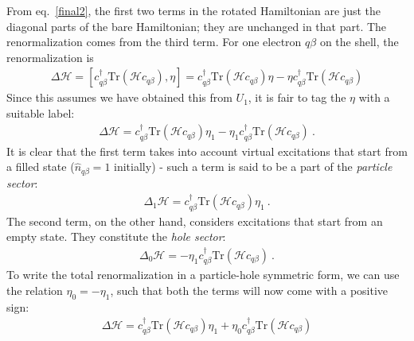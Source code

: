 From eq.~\ref{final2}, the first two terms in the rotated Hamiltonian are just the diagonal parts of the bare Hamiltonian; they are unchanged in that part. The renormalization comes from the third term. For one electron \(q\beta\) on the shell, the renormalization is
\begin{equation}\begin{aligned}
	\Delta \mathcal{H} = \left[c_{q\beta}^\dagger \text{Tr}\left(\mathcal{H} c_{q\beta}\right),\eta\right] = c_{q\beta}^\dagger \text{Tr}\left(\mathcal{H} c_{q\beta}\right)\eta - \eta c_{q\beta}^\dagger \text{Tr}\left(\mathcal{H} c_{q\beta}\right)
\end{aligned}\end{equation}
Since this assumes we have obtained this from \(U_1\), it is fair to tag the \(\eta\) with a suitable label:
\begin{equation}\begin{aligned}
	\Delta \mathcal{H} = c_{q\beta}^\dagger \text{Tr}\left(\mathcal{H} c_{q\beta}\right)\eta_1 - \eta_1 c_{q\beta}^\dagger \text{Tr}\left(\mathcal{H} c_{q\beta}\right)~.
\end{aligned}\end{equation}
It is clear that the first term takes into account virtual excitations that start from a filled state (\(\hat n_{q\beta}=1\) initially) - such a term is said to be a part of the \textit{particle sector}:
\begin{equation}\begin{aligned}
	\Delta_1 \mathcal{H} = c_{q\beta}^\dagger \text{Tr}\left(\mathcal{H} c_{q\beta}\right)\eta_1~.
\end{aligned}\end{equation}
The second term, on the other hand, considers excitations that start from an empty state. They constitute the \textit{hole sector}:
\begin{equation}\begin{aligned}
	\Delta_0 \mathcal{H} = -\eta_1 c_{q\beta}^\dagger \text{Tr}\left(\mathcal{H} c_{q\beta}\right)~.
\end{aligned}\end{equation}
To write the total renormalization in a particle-hole symmetric form, we can use the relation \(\eta_0=-\eta_1\), such that both the terms will now come with a positive sign:
\begin{equation}\begin{aligned}
	\Delta \mathcal{H} = c_{q\beta}^\dagger \text{Tr}\left(\mathcal{H} c_{q\beta}\right)\eta_1 + \eta_0 c_{q\beta}^\dagger \text{Tr}\left(\mathcal{H} c_{q\beta}\right)
\end{aligned}\end{equation}
